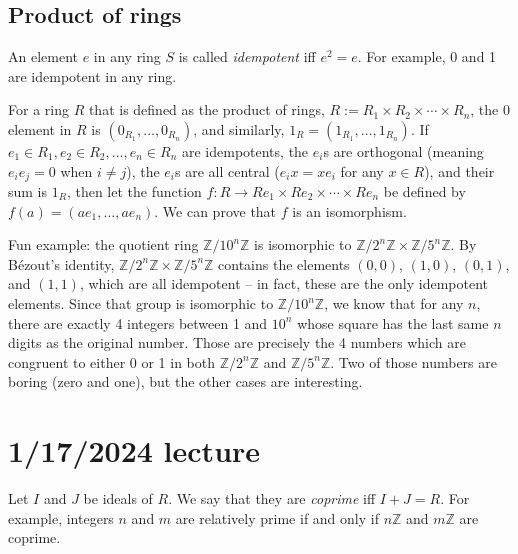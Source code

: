 \documentclass[12pt]{article}
\begin{document}
\subsection{Product of rings}
An element $e$ in any ring $S$ is called \textit{idempotent} iff $e^2=e$. For example, 0 and 1 are idempotent in any ring.
\par
For a ring $R$ that is defined as the product of rings, $R := R_1 \times R_2 \times \cdots \times R_n$, the 0 element in $R$ is $(0_{R_1}, \dots, 0_{R_n})$, and similarly, $1_R = (1_{R_1}, \dots, 1_{R_n})$. If $e_1 \in R_1, e_2 \in R_2, \dots, e_n \in R_n$ are idempotents, the $e_i$s are orthogonal (meaning $e_i e_j =0$ when $i \neq j$), the $e_i$s are all central ($e_ix=xe_i$ for any $x \in R$), and their sum is $1_R$, then let the function $f: R \rightarrow Re_1 \times Re_2 \times \cdots \times Re_n$ be defined by $f(a)=(ae_1, \dots, ae_n)$. We can prove that $f$ is an isomorphism.
\par
Fun example: the quotient ring $ \mathbb{Z}/10^n\mathbb{Z}$ is isomorphic to $\mathbb{Z}/2^n\mathbb{Z} \times \mathbb{Z}/5^n\mathbb{Z}$. By Bézout's identity, $\mathbb{Z}/2^n\mathbb{Z} \times \mathbb{Z}/5^n\mathbb{Z}$ contains the elements $(0,0)$, $(1,0)$, $(0,1)$, and $(1,1)$, which are all idempotent -- in fact, these are the only idempotent elements. Since that group is isomorphic to $ \mathbb{Z}/10^n\mathbb{Z}$, we know that for any $n$, there are exactly 4 integers between 1 and $10^n$ whose square has the last same $n$ digits as the original number. Those are precisely the 4 numbers which are congruent to either 0 or 1 in both $ \mathbb{Z}/2^n\mathbb{Z}$ and $ \mathbb{Z}/5^n\mathbb{Z}$. Two of those numbers are boring (zero and one), but the other cases are interesting.

\section{1/17/2024 lecture}
Let $I$ and $J$ be ideals of $R$. We say that they are \textit{coprime} iff $I+J=R$. For example, integers $n$ and $m$ are relatively prime if and only if $n \mathbb{Z}$ and $m \mathbb{Z}$ are coprime.
\end{document}

